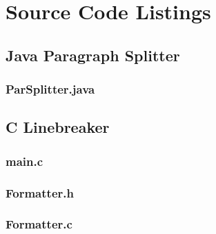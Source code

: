 \chapter{Source Code Listings}


\section{Java Paragraph Splitter}
\subsection{ParSplitter.java}


\newpage

\section{C Linebreaker}
\subsection{main.c}


\newpage

\subsection{Formatter.h}


\newpage

\subsection{Formatter.c}


\newpage

